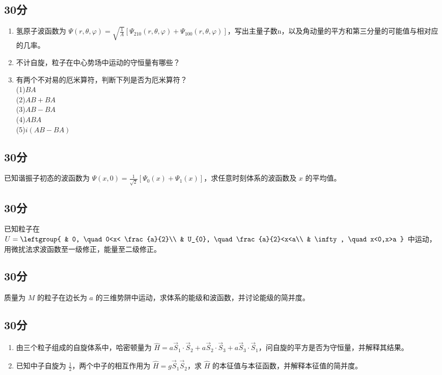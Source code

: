 
\subsection{30分}
\begin{enumerate}
\item 氢原子波函数为 $\displaystyle \varPsi (r,\theta,\varphi)=\sqrt{\frac{1}{A}}[\varPsi_{210}(r,\theta,\varphi)+\varPsi_{100}(r,\theta,\varphi)]$，写出主量子数n，以及角动量的平方和第三分量的可能值与相对应的几率。
\item 不计自旋，粒子在中心势场中运动的守恒量有哪些？
\item 有两个不对易的厄米算符，判断下列是否为厄米算符？\\
(1)$BA$\\(2)$AB+BA$\\(3)$AB-BA$\\(4)$ABA$\\(5)$i(AB-BA)$
\end{enumerate}
\subsection{30分}
已知谐振子初态的波函数为 $\displaystyle \varPsi(x,0)=\frac{1}{\sqrt{2}}[\varPsi_{0}(x)+\varPsi_{1}(x)]$，求任意时刻体系的波函数及 $x$ 的平均值。
\subsection{30分}
已知粒子在 $U=\leftgroup{
    & 0, \quad 0<x< \frac{a}{2}\\
    & U_{0}, \quad \frac{a}{2}<x<a\\
    & \infty, \quad x<0,x>a
}$ 中运动，用微扰法求波函数至一级修正，能量至二级修正。
\subsection{30分}
质量为 $M$ 的粒子在边长为 $a$ 的三维势阱中运动，求体系的能级和波函数，并讨论能级的简并度。
\subsection{30分}
\begin{enumerate}
\item 由三个粒子组成的自旋体系中，哈密顿量为 $\hat {H}=a\vec{S}_1\cdot\vec{S}_2+a\vec{S}_2\cdot\vec{S}_3+a\vec{S}_3\cdot\vec{S}_1$，问自旋的平方是否为守恒量，并解释其结果。
\item 已知中子自旋为 $\frac{1}{2}$，两个中子的相互作用为 $\hat {H}=g\vec{S}_1\vec{S}_2$，求 $\hat {H}$ 的本征值与本征函数，并解释本征值的简并度。
\end{enumerate}